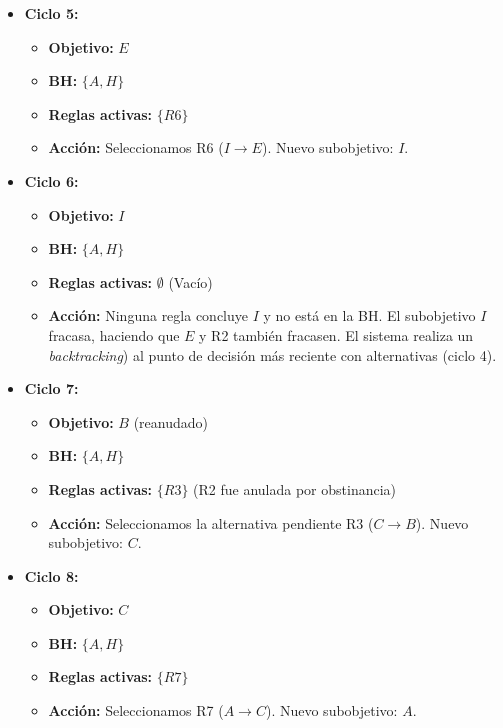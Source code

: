 \documentclass[11pt, a4paper]{article}
\newenvironment{problem}[1][Cuestión]{
	\vspace{0.5cm}
	\noindent{\Large\bfseries #1} \par\vspace{0.5cm}
}{
	\vspace{0.5cm}
}
\begin{document}
\begin{problem}[Cuestión 3 (30 \%)]
{\begin{itemize}
				\item \textbf{Ciclo 5:}
					\begin{itemize}
						\item \textbf{Objetivo:} $E$
						\item \textbf{BH:} $\{A, H\}$
						\item \textbf{Reglas activas:} $\{R6\}$
						\item \textbf{Acción:} Seleccionamos R6 ($I \rightarrow E$). Nuevo subobjetivo: $I$.
					\end{itemize}

				\item \textbf{Ciclo 6:}
					\begin{itemize}
						\item \textbf{Objetivo:} $I$
						\item \textbf{BH:} $\{A, H\}$
						\item \textbf{Reglas activas:} $\emptyset$ (Vacío)
						\item \textbf{Acción:} Ninguna regla concluye $I$ y no está en la BH. El subobjetivo $I$ fracasa, haciendo que $E$ y R2 también fracasen. El sistema realiza un \textit{backtracking}) al punto de decisión más reciente con alternativas (ciclo 4).
					\end{itemize}

				\item \textbf{Ciclo 7:}
					\begin{itemize}
						\item \textbf{Objetivo:} $B$ (reanudado)
						\item \textbf{BH:} $\{A, H\}$
						\item \textbf{Reglas activas:} $\{R3\}$ (R2 fue anulada por obstinancia)
						\item \textbf{Acción:} Seleccionamos la alternativa pendiente R3 ($C \rightarrow B$). Nuevo subobjetivo: $C$.
					\end{itemize}

				\item \textbf{Ciclo 8:}
					\begin{itemize}
						\item \textbf{Objetivo:} $C$
						\item \textbf{BH:} $\{A, H\}$
						\item \textbf{Reglas activas:} $\{R7\}$
						\item \textbf{Acción:} Seleccionamos R7 ($A \rightarrow C$). Nuevo subobjetivo: $A$.
					\end{itemize}


\end{itemize}}
\end{problem}
\end{document}
